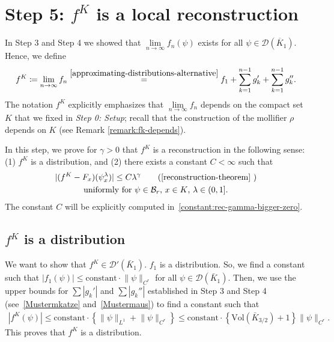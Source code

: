 \section{Step 5: \texorpdfstring{\(f^K\) is a local reconstruction}{fK satisfies the reconstruction theorem}}

In Step 3 and Step 4 we showed that \(\lim\limits_{n \to \infty}f_n(\psi)\) exists for all \(\psi \in \mathcal{D}(\overline{K}_1)\). Hence, we define
\begin{align*}
    f^K \coloneqq \lim\limits_{n \to \infty}f_n \overset{\eqref{approximating-distributions-alternative}}{=} f_1 + \sum^{n-1}_{k=1} g_k' + \sum^{n-1}_{k=1} g_k''.
\end{align*}
The notation \(f^K\) explicitly emphasizes that \(\lim\limits_{n \to \infty}f_n\) depends on the compact set \(K\) that we fixed in \emph{Step 0: Setup}; recall that the construction of the mollifier \(\rho\)  depends on \(K\) (see Remark \ref{remark:fk-depends}).
 
In this step, we prove for \(\gamma > 0\) that \(f^K\) is a reconstruction in the following sense: (1) \(f^K\) is a distribution, and (2) there exists a constant \(C < \infty\) such that 
\begin{gather*}
    |(f^K - F_x)(\psi^\lambda_x)| \leq C \lambda^\gamma \tag{\ref{reconstruction-theorem}
    }\\ 
    \text{uniformly for \(\psi \in \mathcal{B}_r\), \(x \in K\), \(\lambda \in (0,1]\)}.
\end{gather*}
The constant \(C\) will be explicitly computed in~\eqref{constant:rec-gamma-bigger-zero}. 

\subsection*{\(f^K\) is a distribution} 

We want to show that \(f^K \in \mathcal{D}'(\bar K_1)\). \(f_1\) is a distribution. So, we find a constant such that \(|f_1(\psi)| \leq \mathrm{constant} \cdot \lVert \psi \rVert_{C^r}\) for all \(\psi \in \mathcal{D}(\bar K_1)\). Then, we use the upper bounds for \(\sum |g_k'|\) and \(\sum |g_k''|\) established in Step 3 and Step 4 (see~\eqref{Mustermkatze} and~\eqref{Mustermaus}) to find a constant such that  
\begin{align*}
    |f^K(\psi)| \leq \mathrm{constant} \cdot \left\{ \lVert \psi\rVert_{L^1} + \lVert \psi\rVert_{C^r} \right\} \leq  \mathrm{constant} \cdot \left\{  \mathrm{Vol}(\bar K_{3/2}) + 1 \right\} \lVert \psi \rVert_{C^r}.
\end{align*}
This proves that \(f^K\) is a distribution. 


